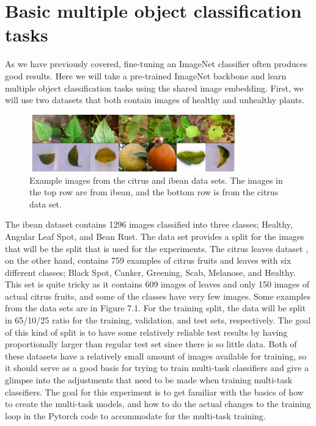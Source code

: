 \section{Basic multiple object classification tasks}
As we have previously covered, fine-tuning an ImageNet classifier often produces good results. 
Here we will take a pre-trained ImageNet backbone and learn multiple object classification tasks using the shared image embedding.
First, we will use two datasets that both contain images of healthy and unhealthy plants.

\begin{figure}[h!]
    \centering
    \includegraphics[width=0.8\textwidth]{imgs/citrus_beans_examples.png}
    \caption{Example images from the citrus and ibean data sets.
    The images in the top row are from ibean, and the bottom row is from the citrus data set.}
\end{figure}

The ibean dataset \citep{beansdata} contains 1296 images classified into three classes; Healthy, Angular Leaf Spot, and Bean Rust.
The data set provides a split for the images that will be the split that is used for the experiments.
The citrus leaves dataset \citep{citrusdata}, on the other hand, contains 759 examples of citrus fruits and leaves with six different classes; Black Spot, Canker, Greening, Scab, Melanose, and Healthy.
This set is quite tricky as it contains 609 images of leaves and only 150 images of actual citrus fruits, and some of the classes have very few images.
Some examples from the data sets are in Figure 7.1.
For the training split, the data will be split in 65/10/25 ratio for the training, validation, and test sets, respectively.
The goal of this kind of split is to have some relatively reliable test results by having proportionally larger than regular test set since there is so little data.
Both of these datasets have a relatively small amount of images available for training, so it should serve as a good basis for trying to train multi-task classifiers and give a glimpse into the adjustments that need to be made when training multi-task classifiers.
The goal for this experiment is to get familiar with the basics of how to create the multi-task models, and how to do the actual changes to the training loop in the Pytorch code to accommodate for the multi-task training.

